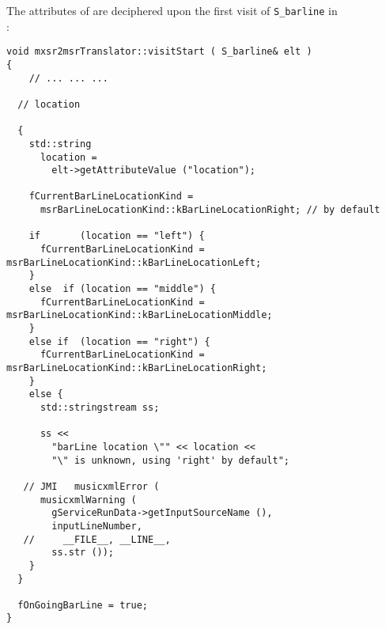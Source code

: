 The attributes of  are deciphered upon the first visit of {\tt S_barline} in\\
:%
\begin{lstlisting}[language=CPlusPlus]
void mxsr2msrTranslator::visitStart ( S_barline& elt )
{
	// ... ... ...

  // location

  {
    std::string
      location =
        elt->getAttributeValue ("location");

    fCurrentBarLineLocationKind =
      msrBarLineLocationKind::kBarLineLocationRight; // by default

    if       (location == "left") {
      fCurrentBarLineLocationKind = msrBarLineLocationKind::kBarLineLocationLeft;
    }
    else  if (location == "middle") {
      fCurrentBarLineLocationKind = msrBarLineLocationKind::kBarLineLocationMiddle;
    }
    else if  (location == "right") {
      fCurrentBarLineLocationKind = msrBarLineLocationKind::kBarLineLocationRight;
    }
    else {
      std::stringstream ss;

      ss <<
        "barLine location \"" << location <<
        "\" is unknown, using 'right' by default";

   // JMI   musicxmlError (
      musicxmlWarning (
        gServiceRunData->getInputSourceName (),
        inputLineNumber,
   //     __FILE__, __LINE__,
        ss.str ());
    }
  }

  fOnGoingBarLine = true;
}
\end{lstlisting}

